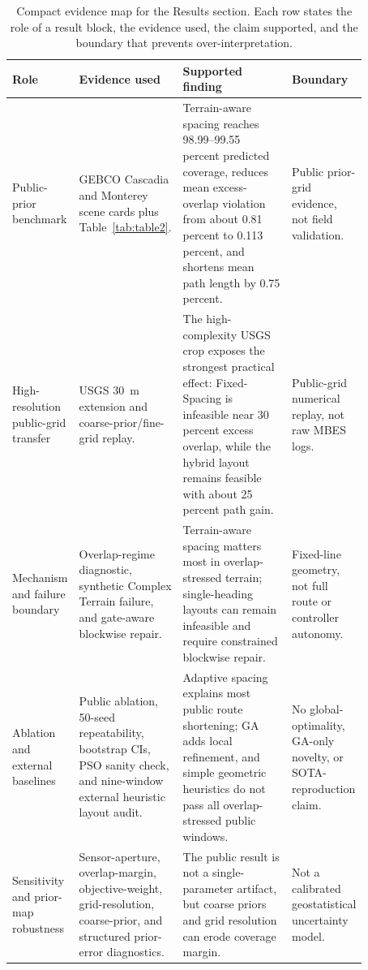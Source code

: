 \documentclass[jmse,article,submit,moreauthors]{Definitions/mdpi}
\begin{document}
\begin{table}[!htbp]
	\centering
	\caption{Compact evidence map for the Results section. Each row states the role of a result block, the evidence used, the claim supported, and the boundary that prevents over-interpretation.}
	\label{tab:evidence_map}
	\scriptsize
	\renewcommand{\arraystretch}{1.08}
	\setlength{\tabcolsep}{3.0pt}
	\begin{tabular}{@{}>{\raggedright\arraybackslash}p{0.18\linewidth}>{\raggedright\arraybackslash}p{0.25\linewidth}>{\raggedright\arraybackslash}p{0.31\linewidth}>{\raggedright\arraybackslash}p{0.13\linewidth}@{}}
		\toprule[1bp]
		\textbf{Role} & \textbf{Evidence used} & \textbf{Supported finding} & \textbf{Boundary} \\
		\midrule[1bp]
		Public-prior benchmark & GEBCO Cascadia and Monterey scene cards plus Table~\ref{tab:table2}. & Terrain-aware spacing reaches 98.99--99.55 percent predicted coverage, reduces mean excess-overlap violation from about 0.81 percent to 0.113 percent, and shortens mean path length by 0.75 percent. & Public prior-grid evidence, not field validation. \\
		High-resolution public-grid transfer & USGS 30~m extension and coarse-prior/fine-grid replay. & The high-complexity USGS crop exposes the strongest practical effect: Fixed-Spacing is infeasible near 30 percent excess overlap, while the hybrid layout remains feasible with about 25 percent path gain. & Public-grid numerical replay, not raw MBES logs. \\
		Mechanism and failure boundary & Overlap-regime diagnostic, synthetic Complex Terrain failure, and gate-aware blockwise repair. & Terrain-aware spacing matters most in overlap-stressed terrain; single-heading layouts can remain infeasible and require constrained blockwise repair. & Fixed-line geometry, not full route or controller autonomy. \\
		Ablation and external baselines & Public ablation, 50-seed repeatability, bootstrap CIs, PSO sanity check, and nine-window external heuristic layout audit. & Adaptive spacing explains most public route shortening; GA adds local refinement, and simple geometric heuristics do not pass all overlap-stressed public windows. & No global-optimality, GA-only novelty, or SOTA-reproduction claim. \\
		Sensitivity and prior-map robustness & Sensor-aperture, overlap-margin, objective-weight, grid-resolution, coarse-prior, and structured prior-error diagnostics. & The public result is not a single-parameter artifact, but coarse priors and grid resolution can erode coverage margin. & Not a calibrated geostatistical uncertainty model. \\

\end{tabular}
\end{table}
\end{document}
